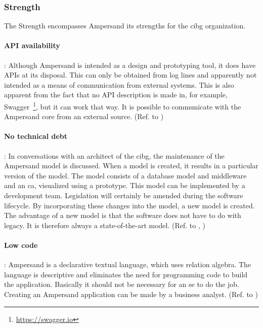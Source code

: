 \subsubsection{Strength}\label{subsub:4_strength}
The Strength encompasses Ampersand its strengths for the \acrshort{cibg} organization.

\paragraph{\textbf{API availability}}\label{swot:s_api_availability}:
Although Ampersand is intended as a design and prototyping tool, it does have APIs at its disposal.
This can only be obtained from log lines and apparently not intended as a means of communication from external systems.
This is also apparent from the fact that no API description is made in, for example, Swagger~\footnote{\url{https://swagger.io}}, but it can work that way.
It is possible to communicate with the Ampersand core from an external source.
(Ref. to )

\paragraph{\textbf{No technical debt}}\label{swot:s_no_technical_debt}:
In conversations with an architect of the \acrshort{cibg}, the maintenance of the Ampersand model is discussed.
When a model is created, it results in a particular version of the model.
The model consists of a database model and middleware and an \acrshort{ca}, visualized using a prototype.
This model can be implemented by a development team.
Legislation will certainly be amended during the software lifecycle.
By incorporating these changes into the model, a new model is created.
The advantage of a new model is that the software does not have to do with legacy.
It is therefore always a state-of-the-art model.
(Ref. to , )

\paragraph{\textbf{Low code}}\label{swot:s_low_code}:
Ampersand is a declarative textual language, which uses relation algebra.
The language is descriptive and eliminates the need for programming code to build the application.
Basically it should not be necessary for an \acrshort{se} to do the job.
Creating an Ampersand application can be made by a business analyst.
(Ref. to )


